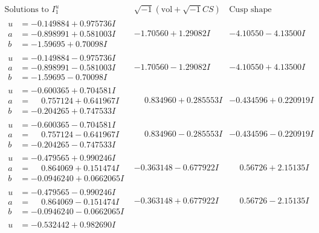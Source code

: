 \documentclass[1p]{elsarticle_modified}
\theoremstyle{definition}
\newcommand{\I}{\sqrt{-1}}
\begin{document}
$$\begin{array}{c|c|c}  
\text{Solutions to }I^u_{1}& \I (\text{vol} + \sqrt{-1}CS) & \text{Cusp shape}\\
 \hline 
\begin{aligned}
u &= -0.149884 + 0.975736 I \\
a &= -0.898991 + 0.581003 I \\
b &= -1.59695 + 0.70098 I\end{aligned}
 & -1.70560 + 1.29082 I & -4.10550 - 4.13500 I \\ \hline\begin{aligned}
u &= -0.149884 - 0.975736 I \\
a &= -0.898991 - 0.581003 I \\
b &= -1.59695 - 0.70098 I\end{aligned}
 & -1.70560 - 1.29082 I & -4.10550 + 4.13500 I \\ \hline\begin{aligned}
u &= -0.600365 + 0.704581 I \\
a &= \phantom{-}0.757124 + 0.641967 I \\
b &= -0.204265 + 0.747533 I\end{aligned}
 & \phantom{-}0.834960 + 0.285553 I & -0.434596 + 0.220919 I \\ \hline\begin{aligned}
u &= -0.600365 - 0.704581 I \\
a &= \phantom{-}0.757124 - 0.641967 I \\
b &= -0.204265 - 0.747533 I\end{aligned}
 & \phantom{-}0.834960 - 0.285553 I & -0.434596 - 0.220919 I \\ \hline\begin{aligned}
u &= -0.479565 + 0.990246 I \\
a &= \phantom{-}0.864069 + 0.151474 I \\
b &= -0.0946240 + 0.0662065 I\end{aligned}
 & -0.363148 - 0.677922 I & \phantom{-}0.56726 + 2.15135 I \\ \hline\begin{aligned}
u &= -0.479565 - 0.990246 I \\
a &= \phantom{-}0.864069 - 0.151474 I \\
b &= -0.0946240 - 0.0662065 I\end{aligned}
 & -0.363148 + 0.677922 I & \phantom{-}0.56726 - 2.15135 I \\ \hline\begin{aligned}
u &= -0.532442 + 0.982690 I \\

\end{aligned}
\end{array}$$
\end{document}
